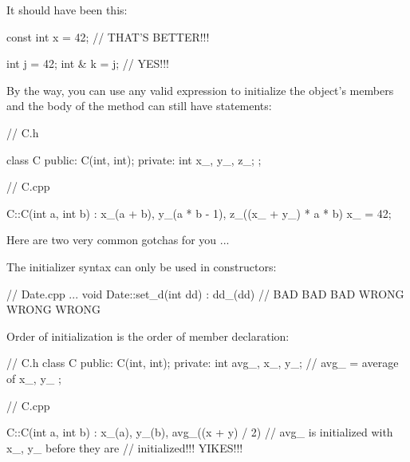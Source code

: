 It should have been this:

\begin{consolethree}[escapeinside=||]
const int x = 42; // THAT'S BETTER!!!

int j = 42;
int & k = j;      // YES!!!
\end{consolethree}

By the way, you can use any valid expression to initialize the object's
members and the body of the method can still have statements:

\begin{consolethree}[escapeinside=||]
// C.h

class C
{
public:
    C(int, int);
private:
    int x_, y_, z_;
};
\end{consolethree}

\begin{consolethree}[escapeinside=||]
// C.cpp

C::C(int a, int b)
    : x_(a + b), y_(a * b - 1), z_((x_ + y_) * a * b)
{
    x_ = 42;
}
\end{consolethree}




\newpage{}

Here are two very common gotchas for you ...

 The initializer syntax can only be used in constructors:

\begin{consolethree}[escapeinside=||]
// Date.cpp
...
void Date::set_d(int dd)
    : dd_(dd)             // BAD BAD BAD WRONG WRONG WRONG
{}
\end{consolethree}

 Order of initialization is the order of member
declaration:

\begin{consolethree}[escapeinside=||]
// C.h
class C
{
public:
    C(int, int);
private:
    int avg_, x_, y_;
    // avg_ = average of x_, y_
};
\end{consolethree}

\begin{consolethree}[escapeinside=||]
// C.cpp

C::C(int a, int b)
    : x_(a), y_(b), avg_((x + y) / 2)
// avg_ is initialized with x_, y_ before they are
// initialized!!! YIKES!!!
{}
\end{consolethree}


